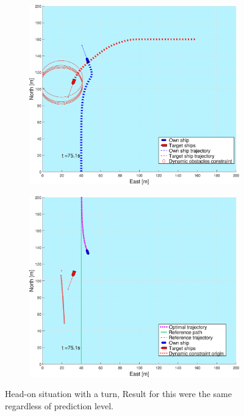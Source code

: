 \begin{figure}[ht!]
\begin{subfigure}[b]{0.494\textwidth}
        \subcaption{}
    \end{subfigure}
    \hfill
    \\
    \begin{subfigure}[b]{0.494\textwidth}
        \centering
        \includegraphics[width=\textwidth]{Images/Figures/sving_HO/_Simple_0fig1_time=75}
        \subcaption{}
    \end{subfigure}
    \hfill
    \begin{subfigure}[b]{0.494\textwidth}
        \centering
        \includegraphics[width=\textwidth]{Images/Figures/sving_HO/_Simple_0fig999_time=75}
        \subcaption{}
    \end{subfigure}
    \hfill
    \caption{Head-on situation with a turn, Result for this were the same regardless of prediction level.}
    \label{FIG: Turn HO}
\end{figure}%
